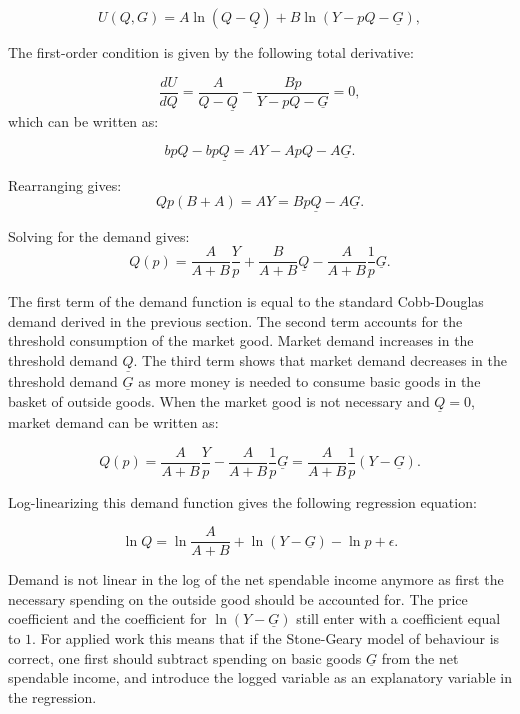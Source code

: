 \documentclass[
]{book}
\begin{document}
\begin{equation}
U(Q,G) = A \ln (Q - \underline{Q}) + B \ln (Y - p Q - \underline{G}),
\end{equation}

The first-order condition is given by the following total derivative:

\begin{equation}
\frac{d U }{d Q} = \frac{A}{Q - \underline{Q}} - \frac{B p}{Y - pQ - \underline{G}} = 0, 
\end{equation}
which can be written as:

\begin{equation}
bpQ - bp\underline{Q} = AY - ApQ - A\underline{G}. 
\end{equation}

Rearranging gives:
\begin{equation}
Qp(B+ A) = AY = Bp\underline{Q} - A\underline{G}.
\end{equation}

Solving for the demand gives:
\begin{equation}
Q(p) = \frac{A}{A+B}\frac{Y}{p} + \frac{B}{A+B}\underline{Q} - \frac{A}{A+B}\frac{1}{p}\underline{G}.
\end{equation}

The first term of the demand function is equal to the standard Cobb-Douglas demand derived in the previous section. The second term accounts for the threshold consumption of the market good. Market demand increases in the threshold demand \(\underline{Q}\). The third term shows that market demand decreases in the threshold demand \(\underline{G}\) as more money is needed to consume basic goods in the basket of outside goods. When the market good is not necessary and \(\underline{Q} = 0\), market demand can be written as:

\begin{equation}
Q(p) = \frac{A}{A+B}\frac{Y}{p} - \frac{A}{A+B}\frac{1}{p}\underline{G} = \frac{A}{A+B}\frac{1}{p}\left(Y - \underline{G} \right).
\end{equation}

Log-linearizing this demand function gives the following regression equation:

\begin{equation}
\ln Q = \ln \frac{A}{A+B} + \ln(Y - \underline{G}) - \ln p + \epsilon.
\end{equation}

Demand is not linear in the log of the net spendable income anymore as first the necessary spending on the outside good should be accounted for. The price coefficient and the coefficient for \(\ln (Y - \underline{G})\) still enter with a coefficient equal to \(1\). For applied work this means that if the Stone-Geary model of behaviour is correct, one first should subtract spending on basic goods \(\underline{G}\) from the net spendable income, and introduce the logged variable as an explanatory variable in the regression.
\end{document}
